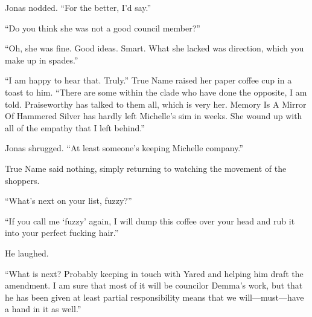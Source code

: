 Jonas nodded. ``For the better, I'd say.''

``Do you think she was not a good council member?''

``Oh, she was fine. Good ideas. Smart. What she lacked was direction, which you make up in spades.''

``I am happy to hear that. Truly.'' True Name raised her paper coffee cup in a toast to him. ``There are some within the clade who have done the opposite, I am told. Praiseworthy has talked to them all, which is very her. Memory Is A Mirror Of Hammered Silver has hardly left Michelle's sim in weeks. She wound up with all of the empathy that I left behind.''

Jonas shrugged. ``At least someone's keeping Michelle company.''

True Name said nothing, simply returning to watching the movement of the shoppers.

``What's next on your list, fuzzy?''

``If you call me `fuzzy' again, I will dump this coffee over your head and rub it into your perfect fucking hair.''

He laughed.

``What is next? Probably keeping in touch with Yared and helping him draft the amendment. I am sure that most of it will be councilor Demma's work, but that he has been given at least partial responsibility means that we will---must---have a hand in it as well.''
